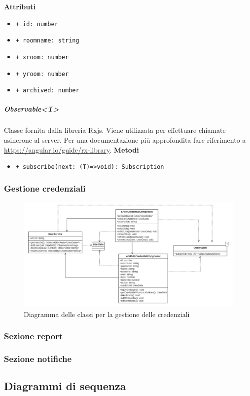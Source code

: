 \textbf{Attributi}
\begin{itemize}
	\item \texttt{+ id: number 	}
	\item \texttt{+ roomname: string 	}
	\item \texttt{+ xroom: number 	}
	\item \texttt{+ yroom: number 	}
	\item \texttt{+ archived: number}
\end{itemize}
\subparagraph{Observable<T>}
Classe fornita dalla libreria Rxjs. Viene utilizzata per effettuare chiamate asincrone al server. Per una documentazione più approfondita fare riferimento a \url{https://angular.io/guide/rx-library}. \newline
\textbf{Metodi}
\begin{itemize}
	\item \texttt{+ subscribe(next: (T)=>void): Subscription}
\end{itemize}

\subsubsection{Gestione credenziali}
\begin{figure}[H]
	\centering
	\includegraphics[width=18cm]{res/images/webapp-credenziali-diagrammaClassi.png}
	\caption{Diagramma delle classi per la gestione delle credenziali}
	\label{fig:DiagrammaClassiCredenziali}
\end{figure}
\subsubsection{Sezione report}
\subsubsection{Sezione notifiche}
\subsection{Diagrammi di sequenza}
